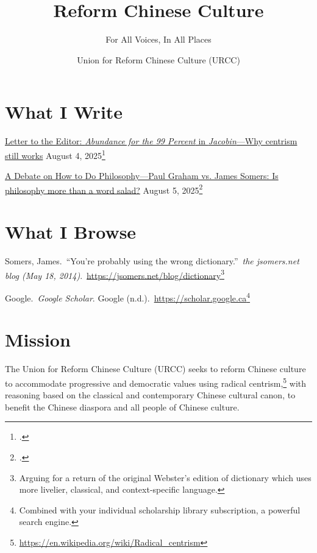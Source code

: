 \documentclass[12pt]{article}
\begin{document}
\title{Reform Chinese Culture}
\subtitle{For All Voices, In All Places}
\author{Union for Reform Chinese Culture (URCC)}

\maketitle

\section{What I Write}

\href{202508Abundance.html}{Letter to the Editor: \textit{Abundance for the 99 Percent} in \textit{Jacobin}---Why centrism still works} August 4, 2025\footcite{einstein}

\href{202508DebateOnPhilosophyPaulGrahamPG.html}{A Debate on How to Do
Philosophy---Paul Graham vs. James Somers: Is philosophy more than a word salad?} August 5, 2025\footcite{althibyaniInvestigatingEffectStudents2023}

\section{What I Browse}

Somers, James.\ \enquote{You're probably using the wrong dictionary.}\ \emph{the jsomers.net blog (May 18, 2014)}.\ \href{https://jsomers.net/blog/dictionary}{https://jsomers.net/blog/dictionary}\footnote{Arguing for a return of the original Webster's edition of dictionary which uses more livelier, classical, and context-specific language.}

Google.\ \emph{Google Scholar}. Google (n.d.).\ \href{https://scholar.google.ca}{https://scholar.google.ca}\footnote{Combined with your individual scholarship library subscription, a powerful search engine.}

\section{Mission}

The Union for Reform Chinese Culture (URCC) seeks to reform Chinese culture to accommodate progressive and democratic values using radical centrism,\footnote{\href{https://en.wikipedia.org/wiki/Radical\_centrism}{https://en.wikipedia.org/wiki/Radical\_centrism}} with reasoning based on the classical and contemporary Chinese cultural canon, to benefit the Chinese diaspora and all people of Chinese culture.

\end{document}
